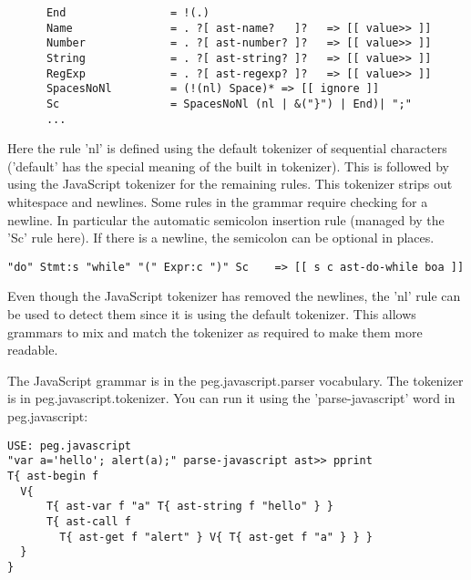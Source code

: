 \begin{itemize}
\begin{verbatim}
      End                = !(.)
      Name               = . ?[ ast-name?   ]?   => [[ value>> ]] 
      Number             = . ?[ ast-number? ]?   => [[ value>> ]]
      String             = . ?[ ast-string? ]?   => [[ value>> ]]
      RegExp             = . ?[ ast-regexp? ]?   => [[ value>> ]]
      SpacesNoNl         = (!(nl) Space)* => [[ ignore ]]
      Sc                 = SpacesNoNl (nl | &("}") | End)| ";"
      ...
\end{verbatim}
      Here the rule 'nl' is defined using the default tokenizer of
      sequential characters ('default' has the special meaning of the
      built in tokenizer). This is followed by using the JavaScript
      tokenizer for the remaining rules. This tokenizer strips out
      whitespace and newlines. Some rules in the grammar require
      checking for a newline. In particular the automatic semicolon
      insertion rule (managed by the 'Sc' rule here). If there is a
      newline, the semicolon can be optional in places.
\begin{verbatim}
"do" Stmt:s "while" "(" Expr:c ")" Sc    => [[ s c ast-do-while boa ]]
\end{verbatim}

      Even though the JavaScript tokenizer has removed the newlines,
      the 'nl' rule can be used to detect them since it is using the
      default tokenizer. This allows grammars to mix and match the
      tokenizer as required to make them more readable.
\end{itemize}

The JavaScript grammar is in the peg.javascript.parser vocabulary. The
tokenizer is in peg.javascript.tokenizer. You can run it using the
'parse-javascript' word in peg.javascript:
\begin{verbatim}
USE: peg.javascript
"var a='hello'; alert(a);" parse-javascript ast>> pprint
T{ ast-begin f
  V{
      T{ ast-var f "a" T{ ast-string f "hello" } }
      T{ ast-call f
        T{ ast-get f "alert" } V{ T{ ast-get f "a" } } }
  }
}
\end{verbatim}

